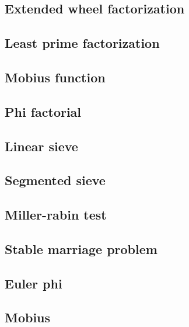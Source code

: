 \subsection{Extended wheel factorization}
\raggedbottom
\hrulefill
\subsection{Least prime factorization}
\raggedbottom
\hrulefill
\subsection{Mobius function}
\raggedbottom
\hrulefill
\subsection{Phi factorial}
\raggedbottom
\hrulefill
\subsection{Linear sieve}
\raggedbottom
\hrulefill
\subsection{Segmented sieve}
\raggedbottom
\hrulefill
\subsection{Miller-rabin test}
\raggedbottom
\hrulefill
\subsection{Stable marriage problem}
\raggedbottom
\hrulefill
\subsection{Euler phi}
\raggedbottom
\hrulefill
\subsection{Mobius}
\raggedbottom
\hrulefill


